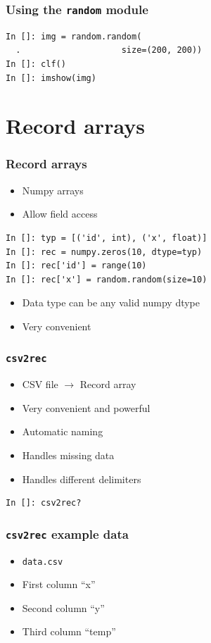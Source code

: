 \documentclass[14pt,compress]{beamer}
\newcounter{time}
\newcommand{\inctime}[1]{\addtocounter{time}{#1}{\tiny \thetime\ m}}
\newcommand{\typ}[1]{\lstinline{#1}}
\begin{document}
\begin{frame}[fragile]
    \frametitle{Using the \typ{random} module}
\begin{lstlisting}
In []: img = random.random(
  .                    size=(200, 200))
In []: clf()
In []: imshow(img)
\end{lstlisting}
\inctime{5}
\end{frame}


\section{Record arrays}

\begin{frame}[fragile]
    \frametitle{Record arrays}
    \begin{itemize}
        \item Numpy arrays
        \item Allow field access 
    \end{itemize}
    \begin{lstlisting}
In []: typ = [('id', int), ('x', float)]
In []: rec = numpy.zeros(10, dtype=typ)
In []: rec['id'] = range(10)
In []: rec['x'] = random.random(size=10)
    \end{lstlisting}
    \begin{itemize}
        \item Data type can be any valid numpy dtype
        \item Very convenient
    \end{itemize}
\end{frame}

\begin{frame}[fragile]
    \frametitle{\typ{csv2rec}}
    \begin{itemize}
        \item CSV file $\rightarrow$ Record array
        \item Very convenient and powerful
        \item Automatic naming
        \item Handles missing data
        \item Handles different delimiters
    \end{itemize}
    \begin{lstlisting}
In []: csv2rec?
    \end{lstlisting}
\end{frame}

\begin{frame}[fragile]
    \frametitle{\typ{csv2rec} example data}
    \begin{itemize}
        \item \typ{data.csv}
        \item First column ``x''
        \item Second column ``y''
        \item Third column ``temp''
    \end{itemize}
\end{frame}
\end{document}
